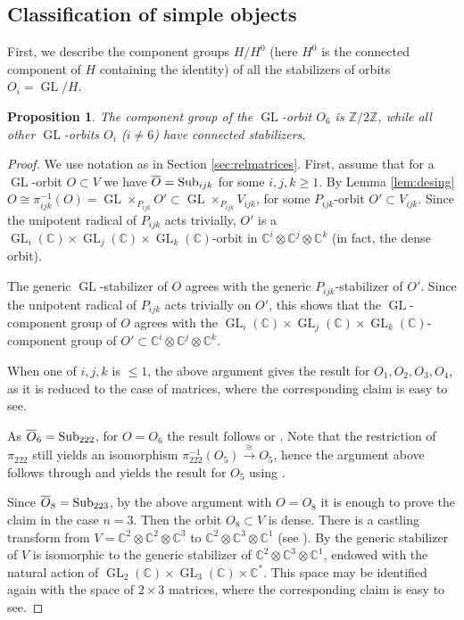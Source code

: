 \documentclass[11pt,reqno]{amsart}
\newcommand{\oo}{\otimes}
\newcommand{\tn}{\textnormal}
\newcommand{\C}{\mathbb{C}}
\newcommand{\GL}{\operatorname{GL}}
\newcommand{\ol}[1]{\overline{#1}}
\newtheorem{prop}[theorem]{Proposition}
\numberwithin{equation}{section}
\begin{document}
\subsection{Classification of simple objects}

First, we describe the component groups $H/H^0$ (here $H^0$ is the connected component of $H$ containing the identity) of all the stabilizers of orbits $O_i = \GL/H$.

\begin{prop}\label{componentGrp}
The component group of the $\GL$-orbit $O_6$ is $\mathbb{Z}/2\mathbb{Z}$, while all other $\GL$-orbits $O_i$ ($i\neq 6$) have connected stabilizers.
\end{prop}

\begin{proof}
We use notation as in Section \ref{sec:relmatrices}. First, assume that for a $\GL$-orbit $O \subset V$ we have $\ol{O} = \tn{Sub}_{ijk}$ for some $i,j,k \geq 1$. By Lemma \ref{lem:desing} $O \cong \pi^{-1}_{ijk}(O) = \GL \times_{P_{ijk}} O' \subset \GL\times_{P_{ijk}} V_{ijk}$, for some $P_{ijk}$-orbit $O' \subset V_{ijk}$. Since the unipotent radical of $P_{ijk}$ acts trivially, $O' $ is a $\GL_i(\C) \times \GL_j (\C) \times \GL_k(\C)$-orbit in $\C^i \oo \C^j \oo \C^k$  (in fact, the dense orbit). 

The generic $\GL$-stabilizer of $O$ agrees with the generic $P_{ijk}$-stabilizer of $O'$. Since the unipotent radical of $P_{ijk}$ acts trivially on $O'$, this shows that the $\GL$-component group of $O$ agrees with the  $\GL_i(\C) \times \GL_j (\C) \times \GL_k(\C)$-component group of $O' \subset \C^i \oo \C^j \oo \C^k$.

When one of $i,j,k$ is $\leq 1$, the above argument gives the result for $O_1, O_2, O_3, O_4$, as it is reduced to the case of matrices, where the corresponding claim is easy to see. 

As $\ol{O}_6 = \tn{Sub}_{222}$, for $O=O_6$ the result follows \cite[Lemma 3.3]{perlman2020equivariant} or \cite[Remark 4.12]{lHorincz2019categories}. Note that the restriction of $\pi_{222}$ still yields an isomorphism $\pi_{222}^{-1}(O_5) \xrightarrow{\cong} O_5$, hence the argument above follows through and yields the result for $O_5$ using \cite[Lemma 3.2]{perlman2020equivariant}.

Since $\ol{O}_8 = \tn{Sub}_{223}$, by the above argument with $O=O_8$ it is enough to prove the claim in the case $n=3$. Then the orbit $O_8 \subset V$ is dense. There is a castling transform from $V=\mathbb{C}^2\oo \mathbb{C}^2\oo \mathbb{C}^3$ to $\mathbb{C}^2\oo \mathbb{C}^3\oo \mathbb{C}^1$ (see \cite[Section 2]{satokimura}). By \cite[Proposition 7]{satokimura} the generic stabilizer of $V$ is isomorphic to the generic stabilizer of $\mathbb{C}^2\oo \mathbb{C}^3\oo \mathbb{C}^1$, endowed with the natural action of $\GL_2(\mathbb{C})\times \GL_3(\mathbb{C})\times \mathbb{C}^{\ast}$. This space may be identified again with the space of $2\times 3$ matrices, where the corresponding claim is easy to see.


\end{proof}
\end{document}
